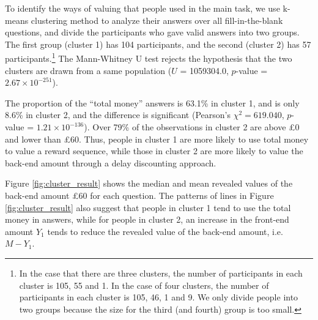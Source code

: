 \documentclass[
  12pt,
]{article}
\begin{document}
To identify the ways of valuing that people used in the main task, we
use k-means clustering method to analyze their answers over all
fill-in-the-blank questions, and divide the participants who gave valid
answers into two groups. The first group (cluster 1) has 104
participants, and the second (cluster 2) has 57 participants.\footnote{In
  the case that there are three clusters, the number of participants in
  each cluster is 105, 55 and 1. In the case of four clusters, the
  number of participants in each cluster is 105, 46, 1 and 9. We only
  divide people into two groups because the size for the third (and
  fourth) group is too small.} The Mann-Whitney U test rejects the
hypothesis that the two clusters are drawn from a same population (\(U\)
= 1059304.0, \(p\)-value = \(2.67 \times 10^{-251}\)).

The proportion of the ``total money'' answers is 63.1\% in cluster 1,
and is only 8.6\% in cluster 2, and the difference is significant
(Pearson's \(\chi^2 = 619.040\), \(p\)-value =
\(1.21\times 10^{-136}\)). Over 79\% of the observations in cluster 2
are above £0 and lower than £60. Thus, people in cluster 1 are more
likely to use total money to value a reward sequence, while those in
cluster 2 are more likely to value the back-end amount through a delay
discounting approach.

Figure \ref{fig:cluster_result} shows the median and mean revealed
values of the back-end amount £60 for each question. The patterns of
lines in Figure \ref{fig:cluster_result} also suggest that people in
cluster 1 tend to use the total money in answers, while for people in
cluster 2, an increase in the front-end amount \(Y_1\) tends to reduce
the revealed value of the back-end amount, i.e.~\(M - Y_1\).
\end{document}
